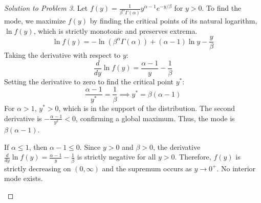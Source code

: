 \documentclass[11pt, a4paper]{article}
\theoremstyle{definition}
\theoremstyle{remark}
\begin{document}
\begin{proof}[Solution to Problem 3]
Let $f(y) = \frac{1}{\beta^\alpha \Gamma(\alpha)} y^{\alpha-1} e^{-y/\beta}$ for $y > 0$. To find the mode, we maximize $f(y)$ by finding the critical points of its natural logarithm, $\ln f(y)$, which is strictly monotonic and preserves extrema.
\[ \ln f(y) = -\ln(\beta^\alpha \Gamma(\alpha)) + (\alpha - 1)\ln y - \frac{y}{\beta} \]
Taking the derivative with respect to $y$:
\[ \frac{d}{dy} \ln f(y) = \frac{\alpha - 1}{y} - \frac{1}{\beta} \]
Setting the derivative to zero to find the critical point $y^*$:
\[ \frac{\alpha - 1}{y^*} = \frac{1}{\beta} \implies y^* = \beta(\alpha - 1) \]
For $\alpha > 1$, $y^* > 0$, which is in the support of the distribution. The second derivative is $-\frac{\alpha-1}{y^2} < 0$, confirming a global maximum. Thus, the mode is $\beta(\alpha - 1)$.

If $\alpha \le 1$, then $\alpha - 1 \le 0$. Since $y > 0$ and $\beta > 0$, the derivative $\frac{d}{dy} \ln f(y) = \frac{\alpha - 1}{y} - \frac{1}{\beta}$ is strictly negative for all $y > 0$. Therefore, $f(y)$ is strictly decreasing on $(0, \infty)$ and the supremum occurs as $y \to 0^+$. No interior mode exists.

\vspace{1em}
\begin{center}
\end{center}
\end{proof}
\end{document}
